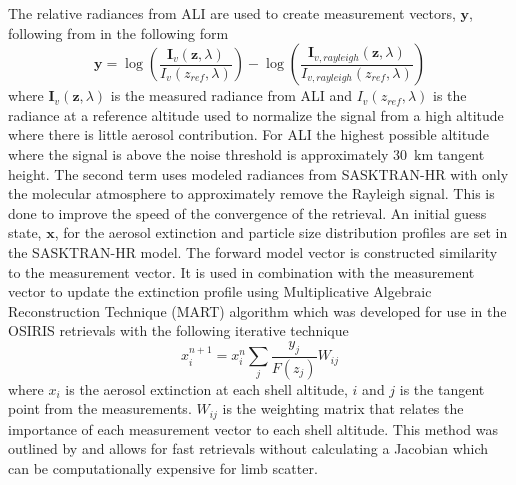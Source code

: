 \documentclass[12pt]{article}
\begin{document}
The relative radiances from ALI are used to create measurement vectors, $\mathbf{y}$, following from \cite{Bourassa2012a} in the following form
\begin{equation}
    \mathbf{y} =
\log\left(\frac{\mathbf{I}_{v}(\mathbf{z},\lambda)}{I_{v}(z_{ref},\lambda)}\right)-\log\left(\frac{\mathbf{I}_{v,rayleigh}(\mathbf{z},\lambda)}{I_{v,rayleigh}(z_{ref},\lambda)}\right)
    \label{eqn:measurementVector}
\end{equation}
where $\mathbf{I}_{v}(\mathbf{z},\lambda)$ is the measured radiance from ALI and $I_{v}(z_{ref},\lambda)$ is the radiance at a reference altitude used to normalize the signal from a high altitude where there is little aerosol contribution. For ALI the highest possible altitude where the signal is above the noise threshold is approximately 30~km tangent height. The second term uses modeled radiances from SASKTRAN-HR with only the molecular atmosphere to approximately remove the Rayleigh signal. This is done to improve the speed of the convergence of the retrieval. An initial guess state, $\mathbf{x}$, for the aerosol extinction and particle size distribution profiles are set in the SASKTRAN-HR model. The forward model vector is constructed similarity to the measurement vector. It is used in combination with the measurement vector to update the extinction profile using Multiplicative Algebraic Reconstruction Technique (MART) algorithm which was developed for use in the OSIRIS retrievals \citep{Bourassa2012a} with the following iterative technique
\begin{equation}
    x_{i}^{n+1} = x_{i}^{n}\sum_{j}\frac{y_{j}}{F(z_{j})}W_{ij}
\end{equation}
where $x_{i}$ is the aerosol extinction at each shell altitude, $i$ and $j$ is the tangent point from the measurements. $W_{ij}$ is the weighting matrix that relates the importance of each measurement vector to each shell altitude. This method was outlined by \cite{Bourassa2007} and allows for fast retrievals without calculating a Jacobian which can be computationally expensive for limb scatter.
\end{document}
